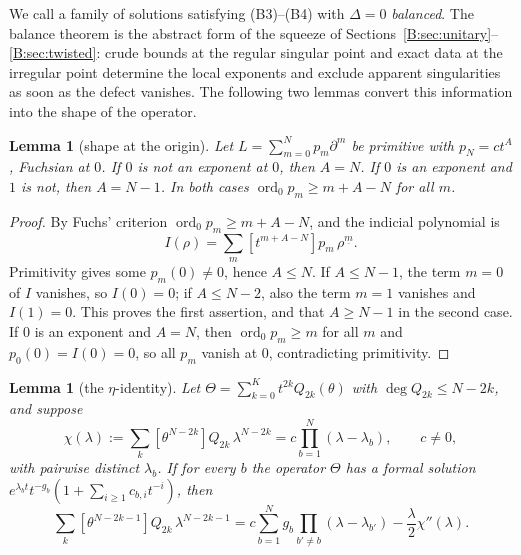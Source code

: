 \documentclass[11pt,a4paper]{article}
\newtheorem{lemma}[theorem]{Lemma}
\theoremstyle{definition}
\theoremstyle{remark}
\newcommand{\ff}[2]{#1^{\underline{#2}}}
\DeclareMathOperator{\ord}{ord}
\numberwithin{equation}{section}
\begin{document}
We call a family of solutions satisfying (B3)--(B4) with $\Delta=0$ \emph{balanced}. The balance theorem is the abstract form of the squeeze of Sections~\ref{B:sec:unitary}--\ref{B:sec:twisted}: crude bounds at the regular singular point and exact data at the irregular point determine the local exponents and exclude apparent singularities as soon as the defect vanishes. The following two lemmas convert this information into the shape of the operator.

\begin{lemma}[shape at the origin]\label{V:lem:shape-t}
Let $L=\sum_{m=0}^{N}p_m\partial^m$ be primitive with $p_N=ct^A$, Fuchsian at $0$. If $0$ is not an exponent at $0$, then $A=N$. If $0$ is an exponent and $1$ is not, then $A=N-1$. In both cases $\ord_0p_m\ge m+A-N$ for all $m$.
\end{lemma}

\begin{proof}
By Fuchs' criterion $\ord_0p_m\ge m+A-N$, and the indicial polynomial is
\[
I(\rho)=\sum_m[t^{m+A-N}]p_m\,\ff{\rho}{m}.
\] Primitivity gives some $p_m(0)\ne0$, hence $A\le N$. If $A\le N-1$, the term $m=0$ of $I$ vanishes, so $I(0)=0$; if $A\le N-2$, also the term $m=1$ vanishes and $I(1)=0$. This proves the first assertion, and that $A\ge N-1$ in the second case. If $0$ is an exponent and $A=N$, then $\ord_0p_m\ge m$ for all $m$ and $p_0(0)=I(0)=0$, so all $p_m$ vanish at $0$, contradicting primitivity.
\end{proof}

\begin{lemma}[the $\eta$-identity]\label{V:lem:eta}
Let $\Theta=\sum_{k=0}^{K}t^{2k}Q_{2k}(\theta)$ with $\deg Q_{2k}\le N-2k$, and suppose
\[
\chi(\lambda):=\sum_{k}[\theta^{N-2k}]Q_{2k}\,\lambda^{N-2k}=c\prod_{b=1}^{N}(\lambda-\lambda_b),\qquad c\ne0,
\]
with pairwise distinct $\lambda_b$. If for every $b$ the operator $\Theta$ has a formal solution $e^{\lambda_bt}t^{-g_b}(1+\sum_{i\ge1}c_{b,i}t^{-i})$, then
\begin{equation}\label{V:eq:eta-gen}
\sum_{k}[\theta^{N-2k-1}]Q_{2k}\,\lambda^{N-2k-1}=c\sum_{b=1}^{N}g_b\prod_{b'\ne b}(\lambda-\lambda_{b'})-\frac\lambda2\chi''(\lambda).
\end{equation}
\end{lemma}
\end{document}
